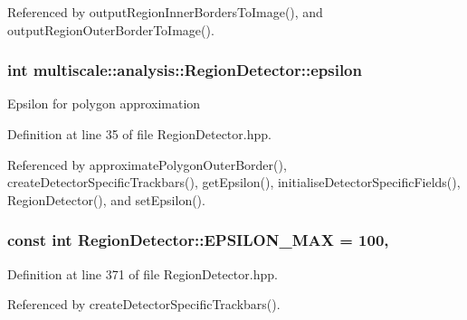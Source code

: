 Referenced by output\-Region\-Inner\-Borders\-To\-Image(), and output\-Region\-Outer\-Border\-To\-Image().

\hypertarget{classmultiscale_1_1analysis_1_1RegionDetector_acf21910fadd7c6ef2810743a78a0aeb9}{
\subsubsection[{epsilon}]{\setlength{\rightskip}{0pt plus 5cm}int multiscale\-::analysis\-::\-Region\-Detector\-::epsilon\hspace{0.3cm}{\ttfamily [private]}}}\label{classmultiscale_1_1analysis_1_1RegionDetector_acf21910fadd7c6ef2810743a78a0aeb9}
Epsilon for polygon approximation 

Definition at line 35 of file Region\-Detector.\-hpp.



Referenced by approximate\-Polygon\-Outer\-Border(), create\-Detector\-Specific\-Trackbars(), get\-Epsilon(), initialise\-Detector\-Specific\-Fields(), Region\-Detector(), and set\-Epsilon().

\hypertarget{classmultiscale_1_1analysis_1_1RegionDetector_a724d57c0db65696f2ddab415deb1138d}{
\subsubsection[{E\-P\-S\-I\-L\-O\-N\-\_\-\-M\-A\-X}]{\setlength{\rightskip}{0pt plus 5cm}const int Region\-Detector\-::\-E\-P\-S\-I\-L\-O\-N\-\_\-\-M\-A\-X = 100\hspace{0.3cm}{\ttfamily [static]}, {\ttfamily [private]}}}\label{classmultiscale_1_1analysis_1_1RegionDetector_a724d57c0db65696f2ddab415deb1138d}


Definition at line 371 of file Region\-Detector.\-hpp.



Referenced by create\-Detector\-Specific\-Trackbars().

